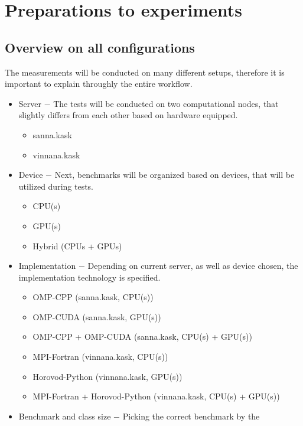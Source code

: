 \chapter{Preparations to experiments}

\section{Overview on all configurations}

The measurements will be conducted on many different setups, therefore it is
important to explain throughly the entire workflow.

\begin{itemize}
    \item Server $-$ The tests will be conducted on two computational
    nodes, that slightly differs from each other based on hardware equipped.
        \begin{itemize}
            \item sanna.kask
            \item vinnana.kask
        \end{itemize}
    \item Device $-$ Next, benchmarks will be organized based on devices,
    that will be utilized during tests.
        \begin{itemize}
            \item CPU\@(s)
            \item GPU\@(s)
            \item Hybrid (CPUs + GPUs)
        \end{itemize}
    \item Implementation $-$ Depending on current server, as well as device
    chosen, the implementation technology is specified.
        \begin{itemize}
            \item OMP-CPP (sanna.kask, CPU\@(s))
            \item OMP-CUDA (sanna.kask, GPU\@(s))
            \item OMP-CPP + OMP-CUDA (sanna.kask, CPU\@(s) + GPU\@(s))
            \item MPI-Fortran (vinnana.kask, CPU\@(s))
            \item Horovod-Python (vinnana.kask, GPU\@(s))
            \item MPI-Fortran + Horovod-Python (vinnana.kask, CPU\@(s) + GPU\@(s))
        \end{itemize}
    \item Benchmark and class size $-$ Picking the correct benchmark by the

\end{itemize}
